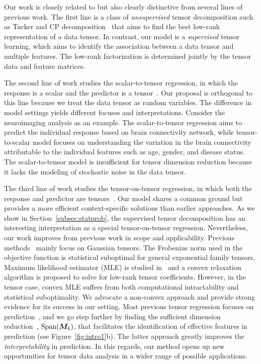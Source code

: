 \documentclass[12pt]{article}
\theoremstyle{plain}
\theoremstyle{definition}
\begin{document}
Our work is closely related to but also clearly distinctive from several lines of previous work. The first line is a class of \textit{unsupervised} tensor decomposition such as Tucker and CP decomposition~\citep{de2000multilinear, kolda2009tensor,zhang2018tensor, hong2020generalized} that aims to find the best low-rank representation of a data tensor. In contrast, our model is a \textit{supervised} tensor learning, which aims to identify the association between a data tensor and multiple features. The low-rank factorization is determined jointly by the tensor data and feature matrices.

The second line of work studies the scalar-to-tensor regression, in which the response is a scalar and the predictor is a tensor~\citep{zhou2013tensor,chen2019non}. Our proposal is orthogonal to this line because we treat the data tensor as random variables. The difference in model settings yields different focuses and interpretations. Consider the neuroimaging analysis as an example. The scalar-to-tensor regression aims to predict the individual response based on brain connectivity network, while tensor-to-scalar model focuses on understanding the variation in the brain connectivity attributable to the individual features such as age, gender, and disease status. The scalar-to-tensor model is insufficient for tensor dimension reduction because it lacks the modeling of stochastic noise in the data tensor. 

The third line of work studies the tensor-on-tensor regression, in which both the response and predictor are tensors~\citep{raskutti2015convex, lock2018tensor, gahrooei2020multiple}. Our model shares a common ground but provides a more efficient context-specific solutions than earlier approaches. As we show in Section~\ref{subsec:statprob}, the supervised tensor decomposition 
has an interesting interpretation as a special tensor-on-tensor regression. Nevertheless, our work improves from previous work in scope and applicability. Previous methods~\citep{gahrooei2020multiple,lock2018tensor} mainly focus on Gaussian tensors. The Frobenius norm used in the objective function is statistical suboptimal for general exponential family tensors. Maximum likelihood estimator (MLE) is studied in~\cite{raskutti2015convex} and a convex relaxation algorithm is proposed to solve for low-rank tensor coefficients. However, in the tensor case, convex MLE suffers from both computational intractability and statistical suboptimality. We advocate a non-convex approach and provide strong evidence for its success in our setting. Most previous tensor regression focuses on prediction~\citep{lock2018tensor,raskutti2015convex,gahrooei2020multiple}, and we go step further by finding the sufficient dimension reduction~\citep{adragni2009sufficient}, $\text{Span}(\bm M_k)$, that facilitates the identification of effective features in prediction (see Figure~\ref{fig:intro1}b). The latter approach greatly improves the \emph{interpretability} in prediction. In this regards, our method opens up new opportunities for tensor data analysis in a wider range of possible applications. 
\end{document}
